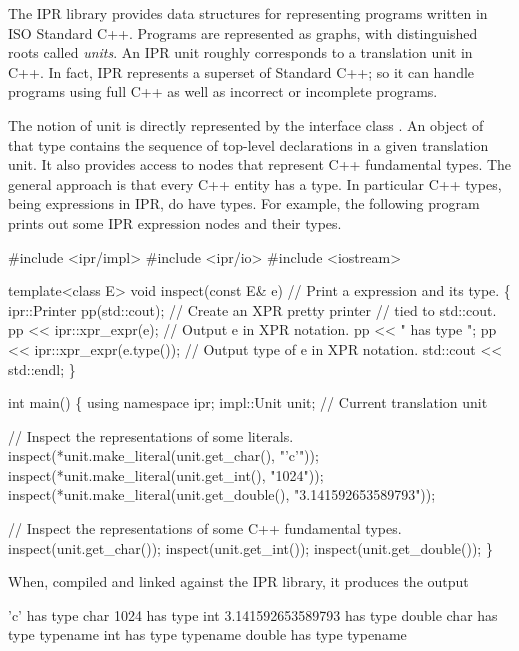 \documentclass[a4paper,12pt]{article}
\begin{document}
The IPR library provides data structures for representing programs written in
ISO Standard C++.  Programs are represented as graphs, with distinguished
roots called \emph{units}.  An IPR unit roughly corresponds to a translation
unit in C++.  In fact, IPR represents a superset of Standard C++; so it can
handle programs using full C++  as well as incorrect or incomplete programs. 

The notion of unit is directly represented by the interface class
. An object of that type contains the sequence of top-level
declarations in a given translation unit. It also provides  access to nodes
that represent C++ fundamental types.  The general approach is that
every C++ entity has a type.  In particular C++ types, being expressions in
IPR, do have types.  For example, the following program prints out some
IPR expression nodes and their types.
\begin{Program}
#include <ipr/impl>
#include <ipr/io>
#include <iostream>

template<class E>
void inspect(const E& e)        // Print a expression and its type.
\{
   ipr::Printer pp(std::cout);  // Create an XPR pretty printer
                                // tied to std::cout.
   pp << ipr::xpr_expr(e);      // Output e in XPR notation.
   pp << " has type ";
   pp << ipr::xpr_expr(e.type()); // Output type of e in XPR notation.
   std::cout << std::endl;
\}

int main()
\{
   using namespace ipr;
   impl::Unit unit;             // Current translation unit

   // Inspect the representations of some literals.
   inspect(*unit.make_literal(unit.get_char(), "'c'"));
   inspect(*unit.make_literal(unit.get_int(), "1024"));
   inspect(*unit.make_literal(unit.get_double(), "3.141592653589793"));

   // Inspect the representations of some C++ fundamental types.
   inspect(unit.get_char());
   inspect(unit.get_int());
   inspect(unit.get_double());
\}
\end{Program}

When, compiled and linked against the IPR library, it produces the output
\begin{Output}
'c' has type char
1024 has type int
3.141592653589793 has type double
char has type  typename
int has type  typename
double has type  typename
\end{Output}

\end{document}
